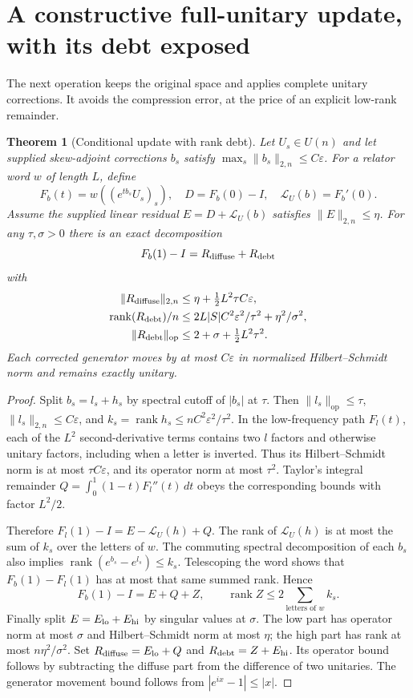 \documentclass[11pt]{article}
\newtheorem{theorem}{Theorem}
\newcommand{\rank}{\operatorname{rank}}
\newcommand{\op}{\mathrm{op}}
\newcommand{\eps}{\varepsilon}
\begin{document}
\section{A constructive full-unitary update, with its debt exposed}
The next operation keeps the original space and applies complete unitary corrections. It avoids the compression error, at the price of an explicit low-rank remainder.
\begin{theorem}[Conditional update with rank debt]
Let $U_s\in U(n)$ and let supplied skew-adjoint corrections $b_s$ satisfy $\max_s\|b_s\|_{2,n}\leq C\eps$. For a relator word $w$ of length $L$, define
\[
F_b(t)=w((e^{tb_s}U_s)_s),\quad
D=F_b(0)-I,\quad \mathcal L_U(b)=F_b'(0).
\]
Assume the supplied linear residual $E=D+\mathcal L_U(b)$ satisfies $\|E\|_{2,n}\leq\eta$. For any $\tau,\sigma>0$ there is an exact decomposition
\[
F_b(1)-I=R_{\rm diffuse}+R_{\rm debt}
\]
with
\begin{align*}
\|R_{\rm diffuse}\|_{2,n}&\leq\eta+\tfrac12L^2\tau C\eps,\\
\rank(R_{\rm debt})/n&\leq2L|S|C^2\eps^2/\tau^2+\eta^2/\sigma^2,\\
\|R_{\rm debt}\|_\op&\leq2+\sigma+\tfrac12L^2\tau^2.
\end{align*}
Each corrected generator moves by at most $C\eps$ in normalized Hilbert--Schmidt norm and remains exactly unitary.
\end{theorem}
\begin{proof}
Split $b_s=l_s+h_s$ by spectral cutoff of $|b_s|$ at $\tau$. Then $\|l_s\|_\op\leq\tau$, $\|l_s\|_{2,n}\leq C\eps$, and $k_s=\rank h_s\leq nC^2\eps^2/\tau^2$.
In the low-frequency path $F_l(t)$, each of the $L^2$ second-derivative terms contains two $l$ factors and otherwise unitary factors, including when a letter is inverted. Thus its Hilbert--Schmidt norm is at most $\tau C\eps$, and its operator norm at most $\tau^2$. Taylor's integral remainder $Q=\int_0^1(1-t)F_l''(t)\,dt$ obeys the corresponding bounds with factor $L^2/2$.

Therefore $F_l(1)-I=E-\mathcal L_U(h)+Q$. The rank of $\mathcal L_U(h)$ is at most the sum of $k_s$ over the letters of $w$. The commuting spectral decomposition of each $b_s$ also implies $\rank(e^{b_s}-e^{l_s})\leq k_s$. Telescoping the word shows that $F_b(1)-F_l(1)$ has at most that same summed rank. Hence
\[
F_b(1)-I=E+Q+Z,\qquad
\rank Z\leq2\sum_{\text{letters of }w}k_s.
\]
Finally split $E=E_{\rm lo}+E_{\rm hi}$ by singular values at $\sigma$. The low part has operator norm at most $\sigma$ and Hilbert--Schmidt norm at most $\eta$; the high part has rank at most $n\eta^2/\sigma^2$. Set $R_{\rm diffuse}=E_{\rm lo}+Q$ and $R_{\rm debt}=Z+E_{\rm hi}$. Its operator bound follows by subtracting the diffuse part from the difference of two unitaries. The generator movement bound follows from $|e^{ix}-1|\leq|x|$.
\end{proof}
\end{document}
